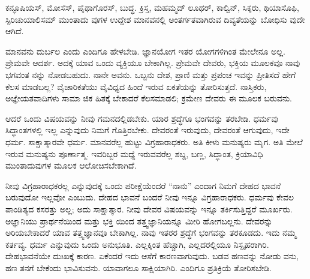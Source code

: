 ಕನ್ಫೂಷಿಯಸ್​, ಮೋಸೆಸ್​, ಪೈಥಾಗೊರಸ್​, ಬುದ್ಧ. ಕ್ರಿಸ್ತ, ಮಹಮ್ಮದ್​ ಲೂಥರ್​, ಕಾಲ್ವಿನ್​, ಸಿಕ್ಕರು, ಥಿಯಾಸೊಫಿ, ಸ್ಪಿರಿಚುಯಾಲಿಸಮ್​ ಮುಂತಾದು ವುಗಳ ಉದ್ದೇಶ ಮಾನವನಲ್ಲಿ ಅಂತರ್ಗತವಾಗಿರುವ ದಿವ್ಯತೆಯನ್ನು ಬೋಧಿಸು ವುದೇ ಆಗಿದೆ.

ಮಾನವನು ದುರ್ಬಲ ಎಂದು ಎಂದಿಗೂ ಹೇಳಬೇಡಿ. ಜ್ಞಾನಯೋಗ ಇತರ ಯೋಗಗಳಿಗಿಂತ ಮೇಲೇನೂ ಅಲ್ಲ. ಪ್ರೇಮವೇ ಆದರ್ಶ. ಅದಕ್ಕೆ ಯಾವ ಒಂದು ವ್ಯಕ್ತಿಯೂ ಬೇಕಾಗಿಲ್ಲ. ಪ್ರೇಮವೇ ದೇವರು, ಭಕ್ತಿಯ ಮೂಲಕವೂ ನಾವು ಭಗವಂತ ನನ್ನು ನೋಡಬಹುದು. ನಾನೇ ಅವನು. ಒಬ್ಬನು ದೇಶ, ಪ್ರಾಣಿ ಮತ್ತು ಪ್ರಪಂಚ ಇವನ್ನು ಪ್ರೀತಿಸದೆ ಹೇಗೆ ಕೆಲಸ ಮಾಡಬಲ್ಲ? ವೈಚಾರಿಕತೆಯು ವೈವಿಧ್ಯದ ಹಿಂದೆ ಇರುವ ಏಕತೆಯನ್ನು ತೋರಿಸುತ್ತದೆ. ನಾಸ್ತಿಕರು, ಅಜ್ಞೇಯತವಾದಿಗಳು ಸಾಮಾ ಜಿಕ ಹಿತಕ್ಕೆ ಬೇಕಾದರೆ ಕೆಲಸಮಾಡಲಿ; ಕ್ರಮೇಣ ದೇವರು ಈ ಮೂಲಕ ಬರುವನು.

ಆದರೆ ಒಂದು ವಿಷಯವನ್ನು ನೀವು ಗಮನದಲ್ಲಿಡಬೇಕು. ಯಾರ ಶ್ರದ್ಧೆಗೂ ಭಂಗವನ್ನು ತರಬೇಡಿ. ಧರ್ಮವು ಸಿದ್ಧಾಂತಗಳಲ್ಲಿ ಇಲ್ಲ ಎನ್ನುವುದು ನಿಮಗೆ ಗೊತ್ತಿರಬೇಕು. ದೇವರಂತೆ ಇರುವುದು, ದೇವರಂತೆ ಆಗುವುದು, ಇದೇ ಧರ್ಮ. ಸಾಕ್ಷಾತ್ಕಾರವೇ ಧರ್ಮ. ಮಾನವರೆಲ್ಲ ಹುಟ್ಟು ವಿಗ್ರಹಾರಾಧಕರು. ಅತಿ ಕೀಳು ಮನುಷ್ಯರು ಮೃಗ. ಅತಿ ಮೇಲೆ ಇರುವ ಮನುಷ್ಯನು ಪೂರ್ಣಾತ್ಮ. ಇವರಿಬ್ಬರ ಮಧ್ಯೆ ಇರುವವರೆಲ್ಲ ಶಬ್ದ, ಬಣ್ಣ, ಸಿದ್ಧಾಂತ, ಕ್ರಿಯಾವಿಧಿ ಮುಂತಾದುವುಗಳ ಮೂಲಕ ಆಲೋಚಿಸಬೇಕಾಗಿದೆ.

ನೀವು ವಿಗ್ರಹಾರಾಧಕರಲ್ಲ ಎನ್ನುವುದಕ್ಕೆ ಒಂದು ಪರೀಕ್ಷೆಯೆಂದರೆ “ನಾನು” ಎಂದಾಗ ನಿಮಗೆ ದೇಹದ ಭಾವನೆ ಬರುವುದೋ ಇಲ್ಲವೋ ಎಂಬುದು. ದೇಹದ ಭಾವನೆ ಬಂದರೆ ನೀವು ಇನ್ನೂ ವಿಗ್ರಹಾರಾಧಕರು. ಧರ್ಮವು ಕೇವಲ ಪಾಂಡಿತ್ಯದ ಕಸರತ್ತು ಅಲ್ಲ; ಅದು ಸಾಕ್ಷಾತ್ಕಾರ. ನೀವು ದೇವರ ವಿಷಯವನ್ನು ಇನ್ನೂ ತರ್ಕಿಸುತ್ತಿದ್ದರೆ ಮೂರ್ಖರು. ಅಜ್ಞಾನಿಯು ಪ್ರಾರ್ಥನೆಯಿಂದ ಮತ್ತು ಭಕ್ತಿ ಯಿಂದ ತತ್ತ್ವಜ್ಞಾನಿಯನ್ನೂ ಮೀರಿ ಹೋಗಬಲ್ಲನು. ದೇವರನ್ನು ಅರಿಯಬೇಕಾದರೆ ಯಾವ ತತ್ತ್ವಜ್ಞಾನವೂ ಬೇಕಾಗಿಲ್ಲ. ನಾವು ಇತರರ ಶ್ರದ್ಧೆಗೆ ಭಂಗವನ್ನು ತರಕೂಡದು. ಇದು ನಮ್ಮ ಕರ್ತವ್ಯ. ಧರ್ಮ ಎನ್ನುವುದು ಒಂದು ಅನುಭೂತಿ. ಎಲ್ಲಕ್ಕಿಂತ ಹೆಚ್ಚಾಗಿ, ಎಲ್ಲದರಲ್ಲಿಯೂ ನಿಸ್ಪೃಹರಾಗಿರಿ. ದೇಹಭಾವನೆಯೇ ದುಃಖಕ್ಕೆ ಕಾರಣ. ಏಕೆಂದರೆ ಇದು ಆಸೆಗೆ ಕಾರಣವಾಗುವುದು. ಬಡವ ಹಣವನ್ನು ನೋಡು ವನು, ಹಣ ತನಗೆ ಬೇಕೆಂದು ಭಾವಿಸುವನು. ಯಾವಾಗಲೂ ಸಾಕ್ಷಿಯಾಗಿರಿ. ಎಂದಿಗೂ ಪ್ರತಿಕ್ರಿಯೆ ತೋರಿಸಬೇಡಿ.

